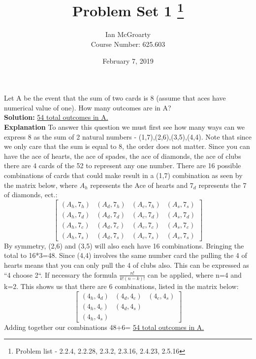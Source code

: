 \documentclass[12pt]{article}
\title{Problem Set 1 \thanks{Problem list - 2.2.4, 2.2.28, 2.3.2, 2.3.16, 2.4.23, 2.5.16}}
\author{Ian McGroarty \\
	Course Number: 625.603}
\date{February 7, 2019}
\newenvironment{problem}[2][Problem]{\begin{trivlist}
\item[\hskip \labelsep {\bfseries #1}\hskip \labelsep {\bfseries #2.}]}{\end{trivlist}}
\begin{document}
\maketitle

\begin{problem}{2.2.4} Let A be the event that the sum of two cards is 8 (assume that aces have numerical value of one). How many outcomes are in A? \\
\textbf{Solution:} \underline{54 total outcomes in A.}  \\
\textbf{Explanation}
To answer this question we must first see how many ways can we express 8 as the sum of 2 natural numbers -  {(1,7),(2,6),(3,5),(4,4)}. Note that since we only care that the sum is equal to 8, the order does not matter. Since you can have the ace of hearts, the ace of spades, the ace of diamonds, the ace of clubs there are 4 cards of the 52 to represent any one number. There are 16 possible combinations of cards that could make result in a (1,7) combination as seen by the matrix below, where $A_h$ represents the Ace of hearts and $7_d$ represents the 7 of diamonds, ect.: 
$$
\begin{bmatrix}
(A_h,7_h) & (A_d,7_h) & (A_c,7_h) & (A_s,7_s) \\
(A_h,7_d) & (A_d,7_d) & (A_c,7_d) & (A_s,7_d) \\
(A_h,7_c) & (A_d,7_c) & (A_c,7_c) & (A_s,7_c) \\
(A_h,7_s) & (A_d,7_s) & (A_c,7_s) & (A_s,7_s) 
\end{bmatrix}
$$
By symmetry,  (2,6) and (3,5) will also each have 16 combinations. Bringing the total to 16*3=48. Since (4,4) involves the same number card the pulling the 4 of hearts means that you can only pull the 4 of clubs also. This can be expressed as ``4 choose 2``. If necessary the formula $\frac{n!}{k!(n-k)!}$ can be applied, where n=4 and k=2. This shows us that there are 6 combinations, listed in the matrix below: 
$$
\begin{bmatrix}
(4_h,4_d) & (4_d,4_c) & (4_c,4_s) \\
(4_h,4_c) & (4_d,4_s) & \\
(4_h,4_s) &  & 
\end{bmatrix}
$$
Adding together our combinations 48+6= \underline{54 total outcomes in A.}
\end{problem}
\end{document}
